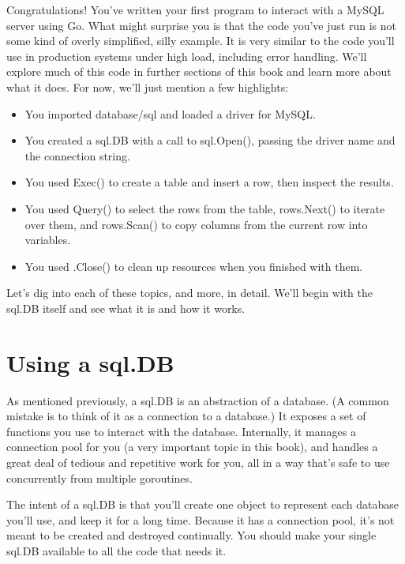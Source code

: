 \documentclass{vivid_layout}
\begin{document}
Congratulations! You’ve written your first program to interact with a MySQL server using Go. What might surprise you is that the code you’ve just run is not some kind of overly simplified, silly example. It is very similar to the code you’ll use in production systems under high load, including error handling. We’ll explore much of this code in further sections of this book and learn more about what it does. For now, we’ll just mention a few highlights:

\begin{itemize}

\item  You imported database/sql and loaded a driver for MySQL.

\item  You created a sql.DB with a call to sql.Open(), passing the
driver name and the connection string.

\item  You used Exec() to create a table and insert a row, then inspect the results.

\item  You used Query() to select the rows from the table, rows.Next() to iterate over them, and rows.Scan() to copy columns from the current row into variables.

\item  You used .Close() to clean up resources when you finished with them.
\end{itemize}

Let’s dig into each of these topics, and more, in detail. We’ll begin
with the sql.DB itself and see what it is and how it works.

\section{Using a sql.DB}

As mentioned previously, a sql.DB is an abstraction of a database.
(A common mistake is to think of it as a connection to a database.)
It exposes a set of functions you use to interact with the database. Internally, it manages a connection pool for you (a very important topic in this book), and handles a great deal of tedious and repetitive work for you, all in a way that’s safe to use concurrently from multiple goroutines.

The intent of a sql.DB is that you’ll create one object to represent each database you’ll use, and keep it for a long time. Because it has a connection pool, it’s not meant to be created and destroyed continually. You should make your single sql.DB available to all the code that needs it.
\end{document}
